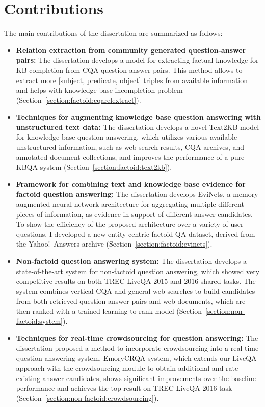 \clearpage

\section{Contributions}
\label{section:intro:contributions}

The main contributions of the dissertation are summarized as follows:
\begin{itemize}
	\item \textbf{Relation extraction from community generated question-answer pairs:} The dissertation develops a model for extracting factual knowledge for KB completion from CQA question-answer pairs.
	This method allows to extract more [subject, predicate, object] triples from available information and helps with knowledge base incompletion problem (Section~\ref{section:factoid:cqarelextract}).
	\item \textbf{Techniques for augmenting knowledge base question answering with unstructured text data:} The dissertation develops a novel Text2KB model for knowledge base question answering, which utilizes various available unstructured information, such as web search results, CQA archives, and annotated document collections, and improves the performance of a pure KBQA system (Section~\ref{section:factoid:text2kb}).
	\item \textbf{Framework for combining text and knowledge base evidence for factoid question answering:} The dissertation develops EviNets, a memory-augmented neural network architecture for aggregating multiple different pieces of information, as evidence in support of different answer candidates.
	To show the efficiency of the proposed architecture over a variety of user questions, I developed a new entity-centric factoid QA dataset, derived from the Yahoo!~Answers archive (Section~\ref{section:factoid:evinets}).
	\item \textbf{Non-factoid question answering system:} The dissertation develops a state-of-the-art system for non-factoid question answering, which showed very competitive results on both TREC LiveQA 2015 and 2016 shared tasks.
	The system combines vertical CQA and general web searches to build candidates from both retrieved question-answer pairs and web documents, which are then ranked with a trained learning-to-rank model (Section~\ref{section:non-factoid:system}).
	\item \textbf{Techniques for real-time crowdsourcing for question answering:} The dissertation proposed a method to incorporate crowdsourcing into a real-time question answering system. EmoryCRQA system, which extends our LiveQA approach with the crowdsourcing module to obtain additional and rate existing answer candidates, shows significant improvements over the baseline performance and achieves the top result on TREC LiveQA 2016 task (Section~\ref{section:non-factoid:crowdsourcing}).

\end{itemize}
